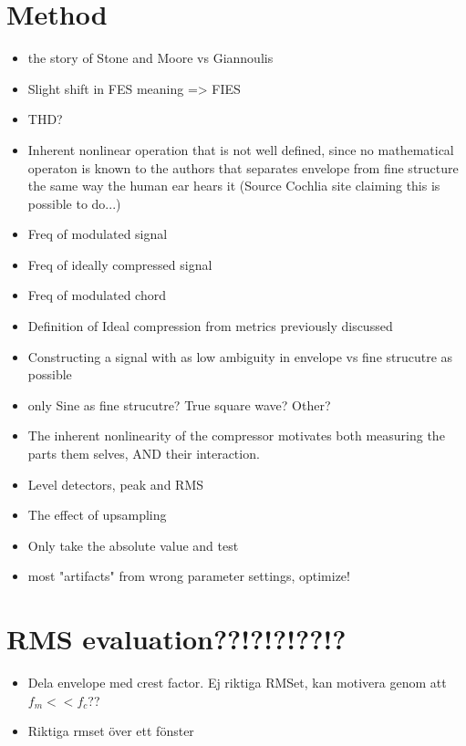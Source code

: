 \documentclass[../main2.tex]{subfiles}
\begin{document}
\section{Method}
\begin{itemize}
	\item the story of Stone and Moore vs Giannoulis
	\item Slight shift in FES meaning => FIES
	\item THD?
	\item Inherent nonlinear operation that is not well defined, since no mathematical operaton is known to the authors that separates envelope from fine structure the same way the human ear hears it (Source Cochlia site claiming this is possible to do...)
	\item Freq of modulated signal
	\item Freq of ideally compressed signal
	\item Freq of modulated chord

	\item Definition of Ideal compression from metrics previously discussed
	\item Constructing a signal with as low ambiguity in envelope vs fine strucutre as possible
	\item only Sine as fine strucutre? True square wave? Other?

	\item The inherent nonlinearity of the compressor motivates both measuring the parts them selves, AND their interaction.
	
	\item Level detectors, peak and RMS
	\item The effect of upsampling
	
	\item Only take the absolute value and test 

	\item most "artifacts" from wrong parameter settings, optimize!
\end{itemize}

\section{RMS evaluation??!?!?!??!?}

\begin{itemize}
\item{Dela envelope med crest factor. Ej riktiga RMSet, kan motivera genom att $f_m<<f_c$??}
\item{Riktiga rmset över ett fönster}
\end{itemize}
\end{document}
